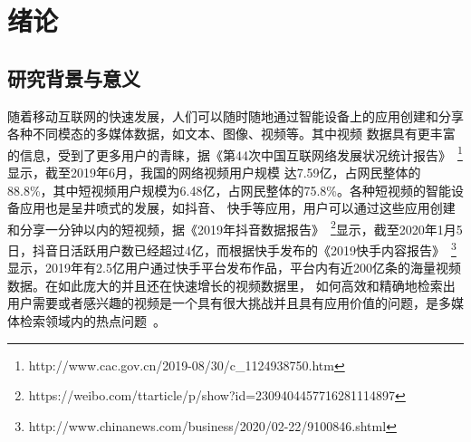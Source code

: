 \chapter{绪论}

\section{研究背景与意义}
随着移动互联网的快速发展，人们可以随时随地通过智能设备上的应用创建和分享各种不同模态的多媒体数据，如文本、图像、视频等。其中视频
数据具有更丰富的信息，受到了更多用户的青睐，据《第44次中国互联网络发展状况统计报告》~\footnote{http://www.cac.gov.cn/2019-08/30/c\_1124938750.htm}显示，截至2019年6月，我国的网络视频用户规模
达7.59亿，占网民整体的88.8\%，其中短视频用户规模为6.48亿，占网民整体的75.8\%。各种短视频的智能设备应用也是呈井喷式的发展，如抖音、
快手等应用，用户可以通过这些应用创建和分享一分钟以内的短视频，据《2019年抖音数据报告》~\footnote{https://weibo.com/ttarticle/p/show?id=2309404457716281114897}显示，截至2020年1月5日，抖音日活跃用户数已经超过4亿，而根据快手发布的《2019快手内容报告》~\footnote{http://www.chinanews.com/business/2020/02-22/9100846.shtml}
显示，2019年有2.5亿用户通过快手平台发布作品，平台内有近200亿条的海量视频数据。在如此庞大的并且还在快速增长的视频数据里，
如何高效和精确地检索出用户需要或者感兴趣的视频是一个具有很大挑战并且具有应用价值的问题，是多媒体检索领域内的热点问题~\cite{hong2017,geetha2008a,hu2011a,peng2018an}。

